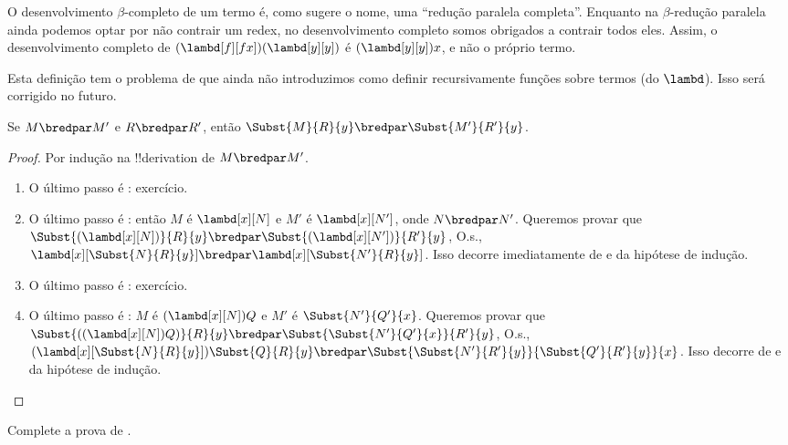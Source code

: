 \documentclass[../../../include/open-logic-section]{subfiles}
\begin{document}
O desenvolvimento $\beta$-completo de um termo é, como sugere o nome, uma
``redução paralela completa''. Enquanto na $\beta$-redução paralela ainda
podemos optar por não contrair um redex, no desenvolvimento completo somos
obrigados a contrair todos eles. Assim, o desenvolvimento completo de
$(\lambd[f][fx])(\lambd[y][y])$ é $(\lambd[y][y])x$, e não o próprio termo.

\begin{editorial}
  Esta definição tem o problema de que ainda não introduzimos como definir
  recursivamente funções sobre termos (do $\lambd$). Isso será corrigido no
  futuro.
\end{editorial}

\begin{lem}
  Se $M \bredpar M'$ e $R \bredpar R'$, então $\Subst{M}{R}{y}
  \bredpar \Subst{M'}{R'}{y}$.
\end{lem}

\begin{proof}
  Por indução na !!{derivation} de $M \bredpar M'$.
  \begin{enumerate}
    \item O último passo é : exercício.
    \item O último passo é : então $M$ é
      $\lambd[x][N]$ e $M'$ é $\lambd[x][N']$,
      onde $N \bredpar N'$. Queremos provar que
      $\Subst{(\lambd[x][N])}{R}{y} \bredpar
      \Subst{(\lambd[x][N'])}{R'}{y}$, O.s.\@,
      $\lambd[x][\Subst{N}{R}{y}] \bredpar
      \lambd[x][\Subst{N'}{R}{y}]$. Isso decorre imediatamente de
       e da hipótese de indução.
    \item O último passo é : exercício.
    \item O último passo é : $M$ é
      $(\lambd[x][N])Q$ e $M'$ é $\Subst{N'}{Q'}{x}$. Queremos provar que
      $\Subst{((\lambd[x][N])Q)}{R}{y} \bredpar
      \Subst{\Subst{N'}{Q'}{x}}{R'}{y}$, O.s.\@,
      $(\lambd[x][\Subst{N}{R}{y}])\Subst{Q}{R}{y} \bredpar
      \Subst{\Subst{N'}{R'}{y}}{\Subst{Q'}{R'}{y}}{x}$. Isso decorre de
       e da hipótese de indução.
  \end{enumerate}
\end{proof}

\begin{prob}
  Complete a prova de .
\end{prob}
\end{document}

